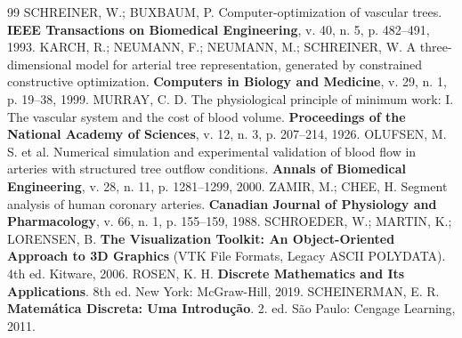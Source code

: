 \documentclass[11pt, a4paper]{article}
\begin{document}
{\small
\begin{thebibliography}{99}
  \setlength{\itemsep}{2pt}
   SCHREINER, W.; BUXBAUM, P. Computer-optimization of vascular trees. \textbf{IEEE Transactions on Biomedical Engineering}, v. 40, n. 5, p. 482--491, 1993.
   KARCH, R.; NEUMANN, F.; NEUMANN, M.; SCHREINER, W. A three-dimensional model for arterial tree representation, generated by constrained constructive optimization. \textbf{Computers in Biology and Medicine}, v. 29, n. 1, p. 19--38, 1999.
   MURRAY, C. D. The physiological principle of minimum work: I. The vascular system and the cost of blood volume. \textbf{Proceedings of the National Academy of Sciences}, v. 12, n. 3, p. 207--214, 1926.
   OLUFSEN, M. S. et al. Numerical simulation and experimental validation of blood flow in arteries with structured tree outflow conditions. \textbf{Annals of Biomedical Engineering}, v. 28, n. 11, p. 1281--1299, 2000.
   ZAMIR, M.; CHEE, H. Segment analysis of human coronary arteries. \textbf{Canadian Journal of Physiology and Pharmacology}, v. 66, n. 1, p. 155--159, 1988.
   SCHROEDER, W.; MARTIN, K.; LORENSEN, B. \textbf{The Visualization Toolkit: An Object-Oriented Approach to 3D Graphics} (VTK File Formats, Legacy ASCII POLYDATA). 4th ed. Kitware, 2006.
   ROSEN, K. H. \textbf{Discrete Mathematics and Its Applications}. 8th ed. New York: McGraw-Hill, 2019.
   SCHEINERMAN, E. R. \textbf{Matemática Discreta: Uma Introdução}. 2. ed. São Paulo: Cengage Learning, 2011.
\end{thebibliography}
}
\end{document}

